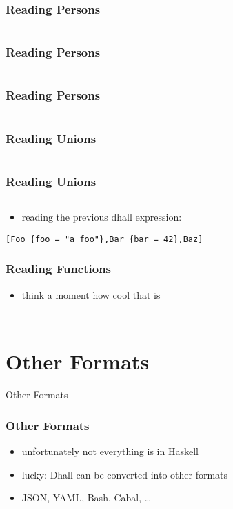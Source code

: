 \documentclass{beamer}
\begin{document}
\begin{frame}
  \frametitle{Reading Persons}
  \inputminted{text}{dhall/persons/people}
\end{frame}

\begin{frame}
  \frametitle{Reading Persons}
  \inputminted{haskell}{snippets/persons.hs}
\end{frame}

\begin{frame}
  \frametitle{Reading Persons}
  \inputminted{haskell}{snippets/persons-main.hs}
\end{frame}

\begin{frame}
  \frametitle{Reading Unions}
  \inputminted{haskell}{dhall/unions.dhall}
\end{frame}

\begin{frame}[fragile]
  \frametitle{Reading Unions}
  \inputminted{haskell}{snippets/unions.hs}
  \begin{itemize}
  \item reading the previous dhall expression:
  \end{itemize}
  \begin{verbatim}
[Foo {foo = "a foo"},Bar {bar = 42},Baz]
  \end{verbatim}
\end{frame}

\begin{frame}[fragile]
  \frametitle{Reading Functions}
  \begin{itemize}
  \item think a moment how cool that is
  \end{itemize}
  \inputminted{haskell}{snippets/function.hs}
  \inputminted{haskell}{snippets/function-input.hs}
\end{frame}

\section{Other Formats}

\begin{frame}
  \begin{center}
    {\Huge Other Formats}
  \end{center}
\end{frame}

\begin{frame}
  \frametitle{Other Formats}
  \begin{itemize}
  \item unfortunately not everything is in Haskell
  \item lucky: Dhall can be converted into other formats
  \item JSON, YAML, Bash, Cabal, \ldots{}
  \end{itemize}
\end{frame}
\end{document}
